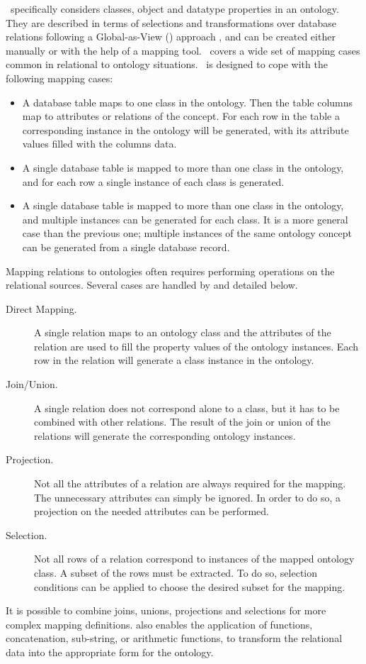 \rtwoo\ specifically considers classes, object and datatype properties in an ontology. They are described in terms of selections and transformations over database relations following a Global-as-View (\gav) approach \cite{Lenzerini_02}, and can be created either manually or with the help of a mapping tool.
\rtwoo\ covers a wide set of mapping cases common in relational to ontology situations. \rtwoo\ is designed to cope with the following mapping cases:
\begin{itemize}
\item A database table maps to one class in the ontology. Then the table columns map to attributes or relations of the concept. For each row in the table a corresponding instance in the ontology will be generated, with its attribute values filled with the columns data.
\item A single database table is mapped to more than one class in the ontology, and for each row a single instance of each class is generated. %
\item A single database table is mapped to more than one class in the ontology, and multiple instances can be generated for each class. It is a more general case than the previous one; multiple instances of the same ontology concept can be generated from a single database record.
\end{itemize}



Mapping relations to ontologies often requires performing operations on the relational sources.
Several cases are handled by \rtwoo and detailed below.
\begin{description}
\item[Direct Mapping.] A single relation maps to an ontology class and the attributes of the relation are used to fill the property values of the ontology instances. Each row in the relation will generate a class instance in the ontology.
\item[Join/Union.] A single relation does not correspond alone to a class, but it has to be combined with other relations. The result of the join or union of the relations will generate the corresponding ontology instances.
\item[Projection.] Not all the attributes of a relation are always required for the mapping. The unnecessary attributes can simply be ignored. In order to do so, a projection on the needed attributes can be performed.
\item[Selection.] Not all rows of a relation correspond to instances of the mapped ontology class. A subset of the rows must be extracted. To do so, selection conditions can be applied to choose the desired subset for the mapping.
\end{description}
It is possible to combine joins, unions, projections and selections for more complex mapping definitions.
\rtwoo also enables the application of functions, \eg concatenation, sub-string, or arithmetic functions, to transform the relational data into the appropriate form for the ontology.



